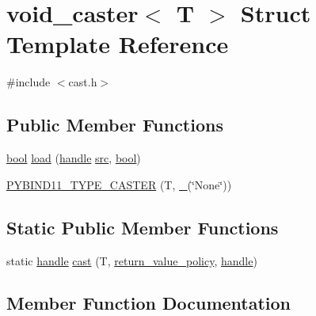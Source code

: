 \hypertarget{structvoid__caster}{}\section{void\+\_\+caster$<$ T $>$ Struct Template Reference}
\label{structvoid__caster}


{\ttfamily \#include $<$cast.\+h$>$}

\subsection*{Public Member Functions}
\begin{DoxyCompactItemize}
\item 
\mbox{\hyperlink{asdl_8h_af6a258d8f3ee5206d682d799316314b1}{bool}} \mbox{\hyperlink{structvoid__caster_af3bd0591b161b1c5b4bfd0a22e75f029}{load}} (\mbox{\hyperlink{classhandle}{handle}} \mbox{\hyperlink{_s_d_l__opengl__glext_8h_a72e0fdf0f845ded60b1fada9e9195cd7}{src}}, \mbox{\hyperlink{asdl_8h_af6a258d8f3ee5206d682d799316314b1}{bool}})
\item 
\mbox{\hyperlink{structvoid__caster_ab96dc719f3db7bfeb6f4aad956013cb2}{P\+Y\+B\+I\+N\+D11\+\_\+\+T\+Y\+P\+E\+\_\+\+C\+A\+S\+T\+ER}} (T, \mbox{\hyperlink{descr_8h_af114703e20c6527e87163eb2798f74b8}{\+\_\+}}(\char`\"{}None\char`\"{}))
\end{DoxyCompactItemize}
\subsection*{Static Public Member Functions}
\begin{DoxyCompactItemize}
\item 
static \mbox{\hyperlink{classhandle}{handle}} \mbox{\hyperlink{structvoid__caster_ae977836c888284ce9d39393c4564476c}{cast}} (T, \mbox{\hyperlink{detail_2common_8h_adde72ab1fb0dd4b48a5232c349a53841}{return\+\_\+value\+\_\+policy}}, \mbox{\hyperlink{classhandle}{handle}})
\end{DoxyCompactItemize}


\subsection{Member Function Documentation}
\mbox{\label{structvoid__caster_ae977836c888284ce9d39393c4564476c}} 

